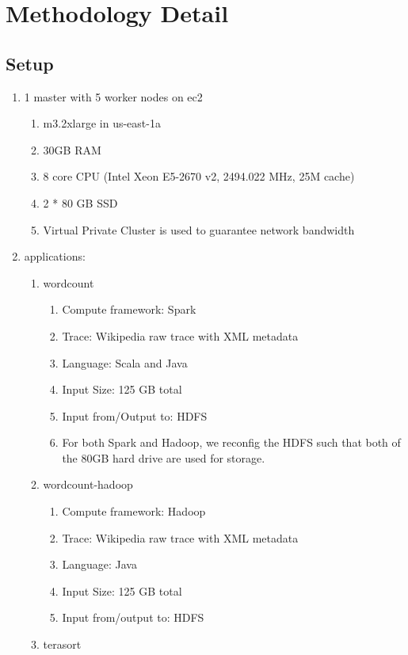 \section{Methodology Detail}

\subsection{Setup}
\begin{enumerate}
\item 1 master with 5 worker nodes on ec2
    \begin{enumerate}
    \item m3.2xlarge in us-east-1a
    \item 30GB RAM
    \item 8 core CPU (Intel Xeon E5-2670 v2, 2494.022 MHz, 25M cache)
    \item 2 * 80 GB SSD
    \item Virtual Private Cluster is used to guarantee network bandwidth
    \end{enumerate}
\item applications:
    \begin{enumerate}
    \item wordcount
        \begin{enumerate}
        \item Compute framework: Spark
        \item Trace: Wikipedia raw trace with XML metadata
        \item Language: Scala and Java
        \item Input Size: 125 GB total
        \item Input from/Output to: HDFS
        \item For both Spark and Hadoop, we reconfig the HDFS such that both of the 80GB hard drive are used for storage.
        \end{enumerate}
    \item wordcount-hadoop
        \begin{enumerate}
        \item Compute framework: Hadoop
        \item Trace: Wikipedia raw trace with XML metadata
        \item Language: Java
        \item Input Size: 125 GB total
        \item Input from/output to: HDFS
        \end{enumerate}
    \item terasort

\end{enumerate}
\end{enumerate}
